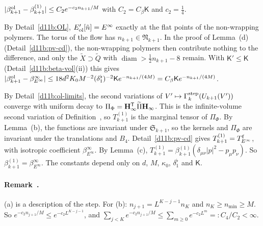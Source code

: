 \begin{detail}\label{d11b:F2}
$|\beta^{\rm ol}_{k+1}-\beta^{(1)}_{k+1}|\le C_2e^{-c_2n_{k+1}/M}$ with $C_2=C_\beta\mathsf K$ and $c_2=\frac14$.
\end{detail}

\begin{step}
By Detail~\ref{d11b:OL}, $E'_{\rm ol}[\tilde n]=E^\infty$ exactly at the flat points of the non-wrapping polymers. The torus of the flow has $n_{k+1}\in\mathfrak N_{k+1}$. In the proof of Lemma~(d) (Detail~\ref{d11b:pv-cd}), the non-wrapping polymers then contribute nothing to the difference, and only the $\tilde X\supset\tilde Q$ with $\operatorname{diam}>\frac12n_{k+1}-8$ remain. With $\mathsf K'\le\mathsf K$ (Detail~\ref{d11b:beta-vol}(ii)) this gives $|\beta^{\rm ol}_{k+1}-\beta^\infty_{E^\infty}|\le18d^2K_0M^{-2}(\delta_1^\flat)^{-2}\mathsf Ke^{-n_{k+1}/(4M)}=C_\beta\mathsf Ke^{-n_{k+1}/(4M)}$.
\end{step}

\begin{step}
By Detail~\ref{d11b:ol-limits}, the second variations of $V'\mapsto\Gamma^{\rm step}_k(U_{k+1}(V'))$ converge with uniform decay to $\Pi_\Phi=\mathbf H_\infty^{\sf T}\widetilde\Pi\mathbf H_\infty$. This is the infinite-volume second variation of Definition~, so $T^{(1)}_{k+1}$ is the marginal tensor of $\Pi_\Phi$. By Lemma~(b), the functions are invariant under $\mathfrak S_{k+1}$, so the kernels and $\Pi_\Phi$ are invariant under the translations and $B_4$. Detail~\ref{d11b:pv-cd} gives $T^{(1)}_{k+1}=T^{\rm f}_{E^\infty}$, with isotropic coefficient $\beta^\infty_{E^\infty}$. By Lemma~(c), $T^{(1)}_{k+1}=\beta^{(1)}_{k+1}(\delta_{\mu\nu}|p|^2-p_\mu p_\nu)$. So $\beta^{(1)}_{k+1}=\beta^\infty_{E^\infty}$. The constants depend only on $d$, $M$, $\kappa_0$, $\delta_1^\flat$ and $\mathsf K$.
\end{step}

\paragraph{Remark~.} (a) is a description of the step. For (b): $n_{j+1}=L^{K-j-1}n_K$ and $n_K\ge n_{\min}\ge M$. So $e^{-c_2n_{j+1}/M}\le e^{-c_2L^{K-j-1}}$, and $\sum_{j<K}e^{-c_2n_{j+1}/M}\le\sum_{m\ge0}e^{-c_2L^m}=:C_4/C_2<\infty$.

